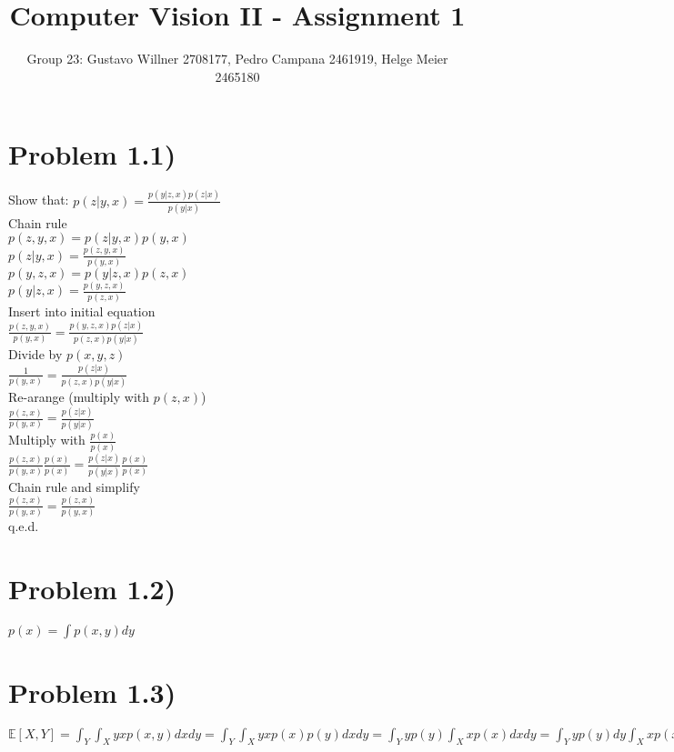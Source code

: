 \documentclass[11pt]{article} %
\title{Computer Vision II - Assignment 1}
\author{Group 23: Gustavo Willner 2708177, Pedro Campana 2461919, Helge Meier 2465180}
\date{}
\begin{document}
	\maketitle
	
	\section*{Problem 1.1)}
	Show that: $p(z \lvert y,x) = \frac{p(y \lvert z,x)p(z \lvert x)}{p(y \lvert x)}$\\
	Chain rule\\
	$p(z,y,x) = p(z \lvert y,x) p(y,x)$\\
	$p(z \lvert y,x) = \frac{p(z,y,x)}{p(y,x)} $\\
	$p(y,z,x) = p(y \lvert z,x) p(z,x)$\\
	$p(y \lvert z,x) = \frac{p(y,z,x)}{p(z,x)} $\\
	Insert into initial equation\\
	$\frac{p(z,y,x)}{p(y,x)}  = \frac{p(y,z,x)p(z \lvert x)}{p(z,x) p(y \lvert x)} $\\
	Divide by $p(x,y,z)$\\
	$\frac{1}{p(y,x)}  = \frac{p(z \lvert x)}{p(z,x) p(y \lvert x)} $\\
	Re-arange (multiply with $p(z , x)$)\\
	$\frac{p(z,x)}{p(y,x)}  = \frac{p(z \lvert x)}{p(y \lvert x)} $\\
	Multiply with $\frac{p(x)}{p(x)}$\\
	$\frac{p(z,x)}{p(y,x)}\frac{p(x)}{p(x)}  = \frac{p(z \lvert x)}{p(y \lvert x)}\frac{p(x)}{p(x)} $\\
	Chain rule and simplify\\
	$\frac{p(z,x)}{p(y,x)}  = \frac{p(z , x)}{p(y , x)} $\\
	q.e.d.
	\section*{Problem 1.2)}
	$p(x) = \int p(x,y) dy$
	\section*{Problem 1.3)}
	$\mathbb{E}\left[X,Y\right] = \int_{Y} \int_{X} yxp(x,y) dxdy = \int_{Y} \int_{X} yxp(x)p(y) dxdy = \int_{Y} yp(y) \int_{X} xp(x) dxdy = \int_{Y} yp(y) dy\int_{X} xp(x) dx = \mathbb{E}\left[Y\right]\mathbb{E}\left[X\right]$\\
\end{document}
